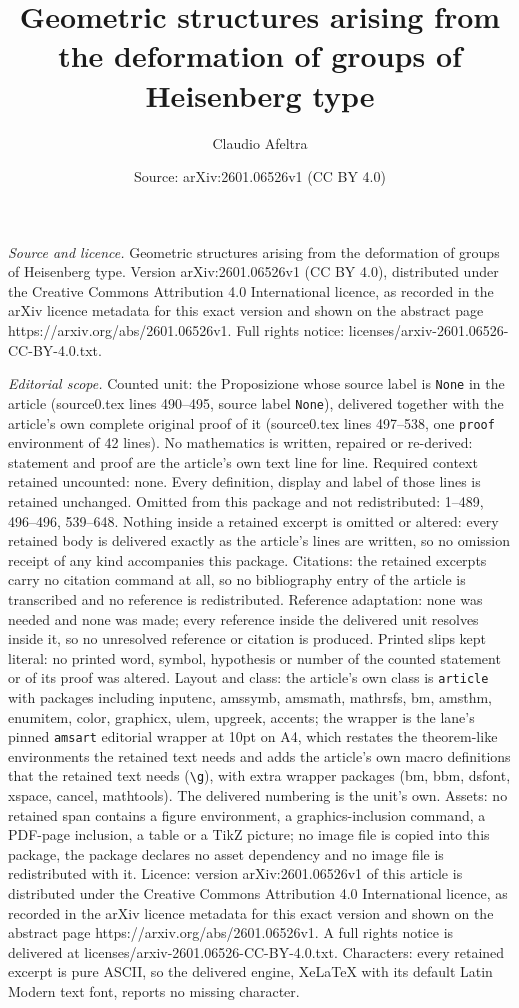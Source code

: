 \documentclass[10pt,a4paper]{amsart}
\title[Geometric structures arising from the deformation of groups ]{Geometric structures arising from the deformation of groups of Heisenberg type}
\author{Claudio Afeltra}
\date{Source: arXiv:2601.06526v1 (CC BY 4.0)}
\begin{document}
\maketitle

\noindent\emph{Source and licence.} Geometric structures arising from the deformation of groups of Heisenberg type. Version arXiv:2601.06526v1 (CC BY 4.0), distributed under the Creative Commons Attribution 4.0 International licence, as recorded in the arXiv licence metadata for this exact version and shown on the abstract page https://arxiv.org/abs/2601.06526v1. Full rights notice: licenses/arxiv-2601.06526-CC-BY-4.0.txt.\par\smallskip

\noindent\textit{Editorial scope.} Counted unit: the Proposizione whose source label is \texttt{None} in the article (source0.tex lines 490--495, source label \texttt{None}), delivered together with the article's own complete original proof of it (source0.tex lines 497--538, one \texttt{proof} environment of 42 lines). No mathematics is written, repaired or re-derived: statement and proof are the article's own text line for line. Required context retained uncounted: none. Every definition, display and label of those lines is retained unchanged. Omitted from this package and not redistributed: 1--489, 496--496, 539--648. Nothing inside a retained excerpt is omitted or altered: every retained body is delivered exactly as the article's lines are written, so no omission receipt of any kind accompanies this package. Citations: the retained excerpts carry no citation command at all, so no bibliography entry of the article is transcribed and no reference is redistributed. Reference adaptation: none was needed and none was made; every reference inside the delivered unit resolves inside it, so no unresolved reference or citation is produced. Printed slips kept literal: no printed word, symbol, hypothesis or number of the counted statement or of its proof was altered. Layout and class: the article's own class is \texttt{article} with packages including inputenc, amssymb, amsmath, mathrsfs, bm, amsthm, enumitem, color, graphicx, ulem, upgreek, accents; the wrapper is the lane's pinned \texttt{amsart} editorial wrapper at 10pt on A4, which restates the theorem-like environments the retained text needs and adds the article's own macro definitions that the retained text needs (\texttt{\textbackslash g}), with extra wrapper packages (bm, bbm, dsfont, xspace, cancel, mathtools). The delivered numbering is the unit's own. Assets: no retained span contains a figure environment, a graphics-inclusion command, a PDF-page inclusion, a table or a TikZ picture; no image file is copied into this package, the package declares no asset dependency and no image file is redistributed with it. Licence: version arXiv:2601.06526v1 of this article is distributed under the Creative Commons Attribution 4.0 International licence, as recorded in the arXiv licence metadata for this exact version and shown on the abstract page https://arxiv.org/abs/2601.06526v1. A full rights notice is delivered at licenses/arxiv-2601.06526-CC-BY-4.0.txt. Characters: every retained excerpt is pure ASCII, so the delivered engine, XeLaTeX with its default Latin Modern text font, reports no missing character.
\end{document}
